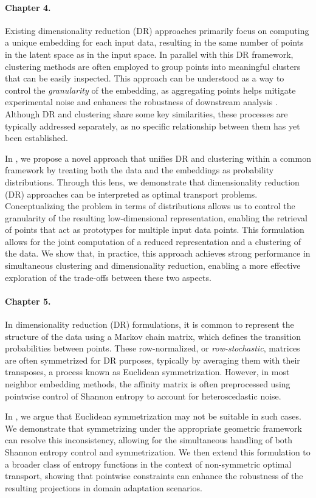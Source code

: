 \paragraph{Chapter 4.}  
Existing dimensionality reduction (DR) approaches primarily focus on computing a unique embedding for each input data, resulting in the same number of points in the latent space as in the input space. In parallel with this DR framework, clustering methods are often employed to group points into meaningful clusters that can be easily inspected. This approach can be understood as a way to control the \emph{granularity} of the embedding, as aggregating points helps mitigate experimental noise and enhances the robustness of downstream analysis \citep{persad2023seacells}. Although DR and clustering share some key similarities, these processes are typically addressed separately, as no specific relationship between them has yet been established.

In , we propose a novel approach that unifies DR and clustering within a common framework by treating both the data and the embeddings as probability distributions. Through this lens, we demonstrate that dimensionality reduction (DR) approaches can be interpreted as optimal transport problems. Conceptualizing the problem in terms of distributions allows us to control the granularity of the resulting low-dimensional representation, enabling the retrieval of points that act as prototypes for multiple input data points. This formulation allows for the joint computation of a reduced representation and a clustering of the data. We show that, in practice, this approach achieves strong performance in simultaneous clustering and dimensionality reduction, enabling a more effective exploration of the trade-offs between these two aspects.

\paragraph{Chapter 5.}  
In dimensionality reduction (DR) formulations, it is common to represent the structure of the data using a Markov chain matrix, which defines the transition probabilities between points. These row-normalized, or \emph{row-stochastic}, matrices are often symmetrized for DR purposes, typically by averaging them with their transposes, a process known as Euclidean symmetrization. However, in most neighbor embedding methods, the affinity matrix is often preprocessed using pointwise control of Shannon entropy to account for heteroscedastic noise.

In , we argue that Euclidean symmetrization may not be suitable in such cases. We demonstrate that symmetrizing under the appropriate geometric framework can resolve this inconsistency, allowing for the simultaneous handling of both Shannon entropy control and symmetrization. We then extend this formulation to a broader class of entropy functions in the context of non-symmetric optimal transport, showing that pointwise constraints can enhance the robustness of the resulting projections in domain adaptation scenarios.
